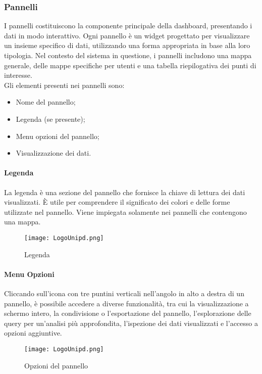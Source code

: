 \documentclass[10pt]{article}
\begin{document}
\begin{justify}
    \subsubsection{Pannelli}
    I pannelli costituiscono la componente principale della dashboard, presentando i dati in modo interattivo. Ogni pannello è un widget progettato per visualizzare un insieme specifico di dati, utilizzando una forma appropriata in base alla loro tipologia. Nel contesto del sistema in questione, i pannelli includono una mappa generale, delle mappe specifiche per utenti e una tabella riepilogativa dei punti di interesse.\\
    Gli elementi presenti nei pannelli sono:
    \begin{itemize}
        \item Nome del pannello;
        \item Legenda (se presente);
        \item Menu opzioni del pannello;
        \item Visualizzazione dei dati.
    \end{itemize}

    \paragraph{Legenda}
    La legenda è una sezione del pannello che fornisce la chiave di lettura dei dati visualizzati. È utile per comprendere il significato dei colori e delle forme utilizzate nel pannello. Viene impiegata solamente nei pannelli che contengono una mappa.
    \begin{figure}[H]
    \centering
    \texttt{[image: LogoUnipd.png]}
    \caption{Legenda}
    \end{figure}

    \paragraph{Menu Opzioni}
    Cliccando sull'icona con tre puntini verticali nell'angolo in alto a destra di un pannello, è possibile accedere a diverse funzionalità, tra cui la visualizzazione a schermo intero, la condivisione o l'esportazione del pannello, l'esplorazione delle query per un'analisi più approfondita, l'ispezione dei dati visualizzati e l'accesso a opzioni aggiuntive.
    \begin{figure}[H]
    \centering
    \texttt{[image: LogoUnipd.png]}
    \caption{Opzioni del pannello}
    \end{figure}


\end{justify}
\end{document}
